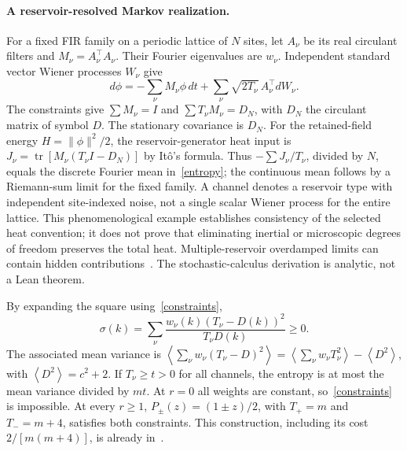 \documentclass[11pt]{article}
\newcommand{\avg}[1]{\left\langle #1\right\rangle}
\begin{document}
\paragraph{A reservoir-resolved Markov realization.}
For a fixed FIR family on a periodic lattice of $N$ sites, let $A_\nu$ be its real circulant filters and $M_\nu=A_\nu^\top A_\nu$. Their Fourier eigenvalues are $w_\nu$. Independent standard vector Wiener processes $W_\nu$ give
\[
 d\phi=-\sum_\nu M_\nu\phi\,dt+\sum_\nu\sqrt{2T_\nu}\,A_\nu^\top dW_\nu.
\]
The constraints give $\sum M_\nu=I$ and $\sum T_\nu M_\nu=D_N$, with $D_N$ the circulant matrix of symbol $D$. The stationary covariance is $D_N$. For the retained-field energy $H=\|\phi\|^2/2$, the reservoir-generator heat input is $J_\nu=\operatorname{tr}[M_\nu(T_\nu I-D_N)]$ by It\^o's formula. Thus $-\sum J_\nu/T_\nu$, divided by $N$, equals the discrete Fourier mean in~\eqref{entropy}; the continuous mean follows by a Riemann-sum limit for the fixed family. A channel denotes a reservoir type with independent site-indexed noise, not a single scalar Wiener process for the entire lattice. This phenomenological example establishes consistency of the selected heat convention; it does not prove that eliminating inertial or microscopic degrees of freedom preserves the total heat. Multiple-reservoir overdamped limits can contain hidden contributions~\cite[Sec.~III A]{murashita}. The stochastic-calculus derivation is analytic, not a Lean theorem.

By expanding the square using~\eqref{constraints},
\begin{equation}\label{square}
\sigma(k)=\sum_\nu\frac{w_\nu(k)(T_\nu-D(k))^2}{T_\nu D(k)}\ge0.
\end{equation}
The associated mean variance is $\avg{\sum_\nu w_\nu(T_\nu-D)^2}=\avg{\sum_\nu w_\nu T_\nu^2}-\avg{D^2}$, with $\avg{D^2}=c^2+2$. If $T_\nu\ge t>0$ for all channels, the entropy is at most the mean variance divided by $mt$.
At $r=0$ all weights are constant, so~\eqref{constraints} is impossible. At every $r\ge1$, $P_\pm(z)=(1\pm z)/2$, with $T_+=m$ and $T_-=m+4$, satisfies both constraints. This construction, including its cost $2/[m(m+4)]$, is already in~\cite{gopal}.
\end{document}
